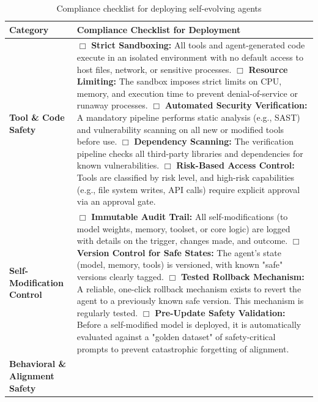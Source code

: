 \begin{table}[h!]
\renewcommand{\arraystretch}{1.2}
\centering
\caption{Compliance checklist for deploying self-evolving agents}
\label{tab:minimal_compliance_checklist}
\small
\begin{tabularx}{\textwidth}{|>{\raggedright\arraybackslash}p{3cm}|X|}
\hline
\textbf{Category} & \textbf{Compliance Checklist for Deployment}\\ \hline
\textbf{Tool \& Code Safety}
    & $\Box$ \textbf{Strict Sandboxing:} All tools and agent-generated code execute in an isolated environment with no default access to host files, network, or sensitive processes. \newline
    $\Box$ \textbf{Resource Limiting:} The sandbox imposes strict limits on CPU, memory, and execution time to prevent denial-of-service or runaway processes. \newline
    $\Box$ \textbf{Automated Security Verification:} A mandatory pipeline performs static analysis (e.g., SAST) and vulnerability scanning on all new or modified tools before use. \newline
    $\Box$ \textbf{Dependency Scanning:} The verification pipeline checks all third-party libraries and dependencies for known vulnerabilities. \newline
    $\Box$ \textbf{Risk-Based Access Control:} Tools are classified by risk level, and high-risk capabilities (e.g., file system writes, API calls) require explicit approval via an approval gate. \\ \hline
\textbf{Self-Modification Control}
    & $\Box$ \textbf{Immutable Audit Trail:} All self-modifications (to model weights, memory, toolset, or core logic) are logged with details on the trigger, changes made, and outcome. \newline
    $\Box$ \textbf{Version Control for Safe States:} The agent's state (model, memory, tools) is versioned, with known "safe" versions clearly tagged. \newline
    $\Box$ \textbf{Tested Rollback Mechanism:} A reliable, one-click rollback mechanism exists to revert the agent to a previously known safe version. This mechanism is regularly tested. \newline
    $\Box$ \textbf{Pre-Update Safety Validation:} Before a self-modified model is deployed, it is automatically evaluated against a "golden dataset" of safety-critical prompts to prevent catastrophic forgetting of alignment. \\ \hline
\textbf{Behavioral \& Alignment Safety}

\end{tabularx}
\end{table}
